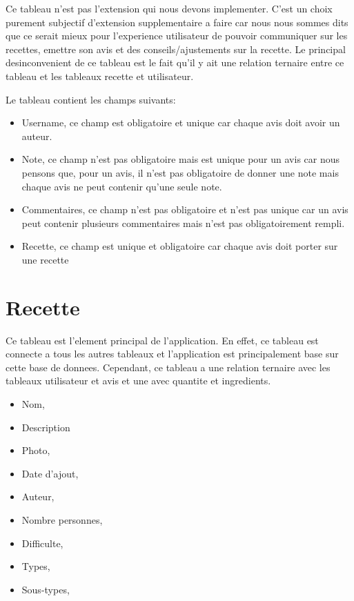 \documentclass[a4paper,10pt]{report}
\begin{document}
Ce tableau n'est pas l'extension qui nous devons implementer. C'est un choix purement subjectif d'extension supplementaire a faire car nous nous sommes dits que ce serait mieux pour l'experience utilisateur de pouvoir communiquer sur les recettes, emettre son avis et des conseils/ajustements sur la recette. Le principal desinconvenient de ce tableau est le fait qu'il y ait une relation ternaire entre ce tableau et les tableaux recette et utilisateur.

Le tableau contient les champs suivants:
\begin{itemize}
	\item Username, ce champ est obligatoire et unique car chaque avis doit avoir un auteur.
	\item Note, ce champ n'est pas obligatoire mais est unique pour un avis car nous pensons que, pour un avis, il n'est pas obligatoire de donner une note mais chaque avis ne peut contenir qu'une seule note.
	\item Commentaires, ce champ n'est pas obligatoire et n'est pas unique car un avis peut contenir plusieurs commentaires mais n'est pas obligatoirement rempli.
	\item Recette, ce champ est unique et obligatoire car chaque avis doit porter sur une recette
\end{itemize}

\section{Recette}

Ce tableau est l'element principal de l'application. En effet, ce tableau est connecte a tous les autres tableaux et l'application est principalement base sur cette base de donnees. Cependant, ce tableau a une relation ternaire avec les tableaux utilisateur et avis et une avec quantite et ingredients.

\begin{itemize}
	\item Nom,
	\item Description
	\item Photo,
	\item Date d'ajout,
	\item Auteur,
	\item Nombre personnes,
	\item Difficulte,
	\item Types,
	\item Sous-types,
\end{itemize}
\end{document}
